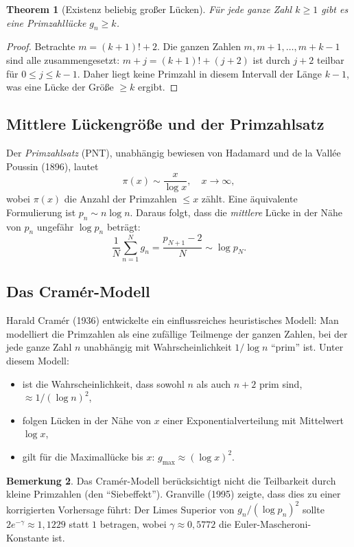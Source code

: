 \documentclass[12pt,a4paper]{amsart}
\newtheorem{theorem}{Theorem}[section]
\theoremstyle{definition}
\newtheorem{bemerkung}[theorem]{Bemerkung}
\begin{document}
\begin{theorem}[Existenz beliebig gro\ss{}er L\"{u}cken]
F\"{u}r jede ganze Zahl $k \geq 1$ gibt es eine Primzahll\"{u}cke $g_n \geq k$.
\end{theorem}

\begin{proof}
Betrachte $m = (k+1)! + 2$. Die ganzen Zahlen $m, m+1, \ldots, m+k-1$ sind
alle zusammengesetzt: $m+j = (k+1)! + (j+2)$ ist durch $j+2$ teilbar f\"{u}r
$0 \leq j \leq k-1$. Daher liegt keine Primzahl in diesem Intervall der L\"{a}nge
$k-1$, was eine L\"{u}cke der Gr\"{o}\ss{}e $\geq k$ ergibt.
\end{proof}

\subsection{Mittlere L\"{u}ckengr\"{o}\ss{}e und der Primzahlsatz}

Der \emph{Primzahlsatz} (PNT), unabh\"{a}ngig bewiesen von Hadamard und de la
Vall\'{e}e Poussin (1896), lautet
\[
  \pi(x) \sim \frac{x}{\log x}, \quad x \to \infty,
\]
wobei $\pi(x)$ die Anzahl der Primzahlen $\leq x$ z\"{a}hlt. Eine \"{a}quivalente
Formulierung ist $p_n \sim n \log n$. Daraus folgt, dass die \emph{mittlere}
L\"{u}cke in der N\"{a}he von $p_n$ ungef\"{a}hr $\log p_n$ betr\"{a}gt:
\[
  \frac{1}{N} \sum_{n=1}^{N} g_n = \frac{p_{N+1} - 2}{N} \sim \log p_N.
\]

\subsection{Das Cram\'{e}r-Modell}

Harald Cram\'{e}r (1936) entwickelte ein einflussreiches heuristisches Modell:
Man modelliert die Primzahlen als eine zuf\"{a}llige Teilmenge der ganzen Zahlen,
bei der jede ganze Zahl $n$ unabh\"{a}ngig mit Wahrscheinlichkeit $1/\log n$
``prim'' ist. Unter diesem Modell:
\begin{itemize}
  \item ist die Wahrscheinlichkeit, dass sowohl $n$ als auch $n+2$ prim sind,
        $\approx 1/(\log n)^2$,
  \item folgen L\"{u}cken in der N\"{a}he von $x$ einer Exponentialverteilung mit
        Mittelwert $\log x$,
  \item gilt f\"{u}r die Maximall\"{u}cke bis $x$: $g_{\max} \approx (\log x)^2$.
\end{itemize}

\begin{bemerkung}
Das Cram\'{e}r-Modell ber\"{u}cksichtigt nicht die Teilbarkeit durch kleine
Primzahlen (den "`Siebeffekt"'). Granville (1995) zeigte, dass dies zu einer
korrigierten Vorhersage f\"{u}hrt: Der Limes Superior von $g_n/(\log p_n)^2$
sollte $2e^{-\gamma} \approx 1{,}1229$ statt $1$ betragen, wobei
$\gamma \approx 0{,}5772$ die Euler-Mascheroni-Konstante ist.
\end{bemerkung}
\end{document}
